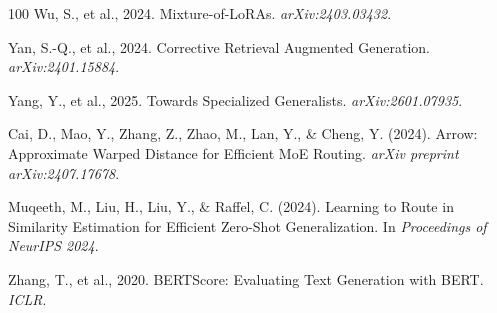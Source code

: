 \documentclass[a4paper,fleql]{cas-sc}
\begin{document}
\begin{thebibliography}{100}
Wu, S., et al., 2024. Mixture-of-LoRAs. \textit{arXiv:2403.03432}.

Yan, S.-Q., et al., 2024. Corrective Retrieval Augmented Generation. \textit{arXiv:2401.15884}.

Yang, Y., et al., 2025. Towards Specialized Generalists. \textit{arXiv:2601.07935}.

Cai, D., Mao, Y., Zhang, Z., Zhao, M., Lan, Y., \& Cheng, Y. (2024).
\newblock Arrow: Approximate Warped Distance for Efficient MoE Routing.
\newblock \textit{arXiv preprint arXiv:2407.17678}.

Muqeeth, M., Liu, H., Liu, Y., \& Raffel, C. (2024).
\newblock Learning to Route in Similarity Estimation for Efficient Zero-Shot Generalization.
\newblock In \textit{Proceedings of NeurIPS 2024}.

Zhang, T., et al., 2020. BERTScore: Evaluating Text Generation with BERT. \textit{ICLR}.

\end{thebibliography}

\clearpage
\appendix
\end{document}
